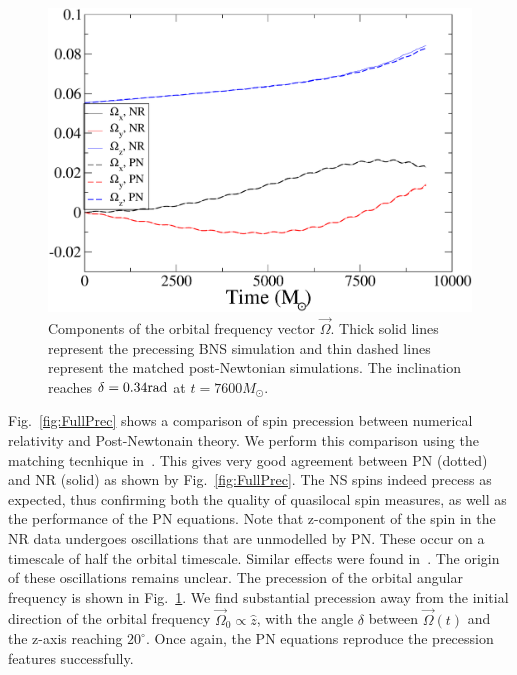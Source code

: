 \begin{figure}
\includegraphics[width=0.95\columnwidth]{chap2/OmegaVectorMatchedUnmatched}
\caption[Components of the orbital frequency vectors during our evolutions.]{\label{fig:OmegaVectorComparison} Components of the orbital
  frequency vector $\vec\Omega$. Thick solid lines represent the
  precessing BNS simulation and thin
  dashed lines represent the matched  post-Newtonian simulations. The inclination reaches $\delta=0.34 {\rm rad}$ at $t=7600M_{\odot}$.}
\end{figure}


Fig.~\ref{fig:FullPrec} shows a comparison of spin precession
  between numerical relativity and Post-Newtonain theory. We perform
  this comparison using
  the matching tecnhique in~\cite{OssokineEtAl:2014}. This gives very good agreement between PN
  (dotted) and NR (solid) as shown by Fig.~\ref{fig:FullPrec}. The NS spins indeed precess as expected,
  thus confirming both the quality of quasilocal spin measures, as
  well as the performance of the PN equations. Note that z-component of the spin in the NR data undergoes oscillations that are unmodelled by PN. These occur on a timescale of half the orbital timescale. Similar effects were found in~\cite{OssokineEtAl:2014}. The origin of these oscillations remains unclear.  The precession of the
  orbital angular frequency is shown in
  Fig.~\ref{fig:OmegaVectorComparison}. We find substantial
  precession away from the initial direction of the orbital frequency
  $\vec\Omega_0\propto \hat z$, with the angle $\delta$ between
  $\vec\Omega(t)$ and the z-axis reaching $20^\circ$. Once again,
  the PN equations reproduce the precession
  features successfully. 

